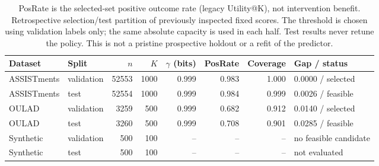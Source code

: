 \begin{table}[t]
\centering\small
\caption{PosRate is the selected-set positive outcome rate (legacy Utility@K), not intervention benefit. Retrospective selection/test partition of previously inspected fixed scores. The threshold is chosen using validation labels only; the same absolute capacity is used in each half. Test results never retune the policy. This is not a pristine prospective holdout or a refit of the predictor.}
\label{tab:selection-test}
\begin{tabular}{llrrrrrl}
\toprule
Dataset & Split & $n$ & $K$ & $\gamma$ (bits) & PosRate & Coverage & Gap / status \\
\midrule
ASSISTments & validation & 52553 & 1000 & 0.999 & 0.983 & 1.000 & 0.0000 / selected \\
ASSISTments & test & 52554 & 1000 & 0.999 & 0.984 & 0.999 & 0.0026 / feasible \\
OULAD & validation & 3259 & 500 & 0.999 & 0.682 & 0.912 & 0.0140 / selected \\
OULAD & test & 3260 & 500 & 0.999 & 0.708 & 0.901 & 0.0285 / feasible \\
Synthetic & validation & 500 & 100 & -- & -- & -- & no feasible candidate \\
Synthetic & test & 500 & 100 & -- & -- & -- & not evaluated \\
\bottomrule
\end{tabular}
\end{table}
